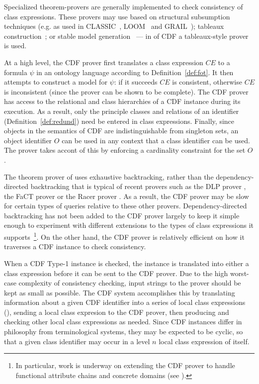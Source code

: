 Specialized theorem-provers are generally implemented to check
consistency of class expressions.  These provers may use based on
structural subsumption techniques (e.g. as used in
CLASSIC~\cite{PMBRB91}, LOOM~\cite{MacB94} and GRAIL~\cite{RBGHNS97});
tableaux construction~\cite{HoPS99}; or stable model
generation~\cite{Swif04} --- in \version{} of CDF a tableaux-style
prover is used.

At a high level, the CDF prover first translates a class expression
$CE$ to a formula $\psi$ in an ontology language according to
Definition~\ref{def:fot}.  It then attempts to construct a model for
$\psi$: if it succeeds $CE$ is consistent, otherwise $CE$ is
inconsistent (since the prover can be shown to be complete).  The CDF
prover has access to the relational and class hierarchies of a CDF
instance during its execution.  As a result, only the principle
classes and relations of an identifier (Definition~\ref{def:redund})
need be entered in class expressions.  Finally, since objects in the
semantics of CDF are indistinguishable from singleton sets, an object
identifier $O$ can be used in any context that a class identifier can
be used.  The prover takes accont of this by enforcing a cardinality
constraint for the set $O$.

The theorem prover of \version{} uses exhaustive backtracking, rather
than the dependency-directed backtracking that is typical of recent
provers such as the DLP prover \cite{}, the FaCT prover \cite{} or the
Racer prover \cite{}.  As a result, the CDF prover may be slow for
certain types of queries relative to these other provers.
Dependency-directed backtracking has not been added to the CDF prover
largely to keep it simple enough to experiment with different
extensions to the types of class expressions it supports~\footnote{In
particular, work is underway on extending the CDF prover to handle
functional attribute chains and concrete domains (see \cite{}).}.  On
the other hand, the CDF prover is relatively efficient on how it
traverses a CDF instance to check consistency.

When a CDF Type-1 instance is checked, the instance is translated into
either a class expression before it can be sent to the CDF prover.
Due to the high worst-case complexity of consistency checking, input
strings to the prover should be kept as small as possible.  The CDF
system accomplishes this by translating information about a given CDF
identifier into a series of local class expressions
(), sending a local class expresion to the CDF prover,
then producing and checking other local class expressions as needed.
Since CDF instances differ in philosophy from terminological systems,
they may be expected to be cyclic, so that a given class identifier
may occur in a level $n$ local class expression of itself.


